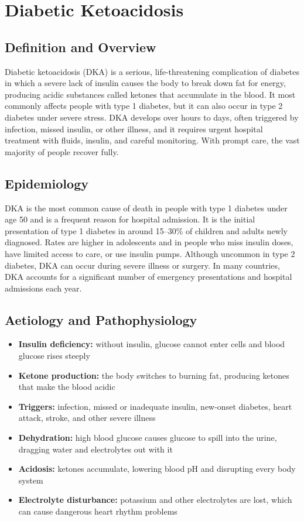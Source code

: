 \chapter{Diabetic Ketoacidosis}

\section*{Definition and Overview}
Diabetic ketoacidosis (DKA) is a serious, life-threatening complication of diabetes in which a severe lack of insulin causes the body to break down fat for energy, producing acidic substances called ketones that accumulate in the blood. It most commonly affects people with type 1 diabetes, but it can also occur in type 2 diabetes under severe stress. DKA develops over hours to days, often triggered by infection, missed insulin, or other illness, and it requires urgent hospital treatment with fluids, insulin, and careful monitoring. With prompt care, the vast majority of people recover fully.

\section*{Epidemiology}
DKA is the most common cause of death in people with type 1 diabetes under age 50 and is a frequent reason for hospital admission. It is the initial presentation of type 1 diabetes in around 15--30\% of children and adults newly diagnosed. Rates are higher in adolescents and in people who miss insulin doses, have limited access to care, or use insulin pumps. Although uncommon in type 2 diabetes, DKA can occur during severe illness or surgery. In many countries, DKA accounts for a significant number of emergency presentations and hospital admissions each year.

\section*{Aetiology and Pathophysiology}
\begin{itemize}
    \item \textbf{Insulin deficiency:} without insulin, glucose cannot enter cells and blood glucose rises steeply
    \item \textbf{Ketone production:} the body switches to burning fat, producing ketones that make the blood acidic
    \item \textbf{Triggers:} infection, missed or inadequate insulin, new-onset diabetes, heart attack, stroke, and other severe illness
    \item \textbf{Dehydration:} high blood glucose causes glucose to spill into the urine, dragging water and electrolytes out with it
    \item \textbf{Acidosis:} ketones accumulate, lowering blood pH and disrupting every body system
    \item \textbf{Electrolyte disturbance:} potassium and other electrolytes are lost, which can cause dangerous heart rhythm problems
\end{itemize}

